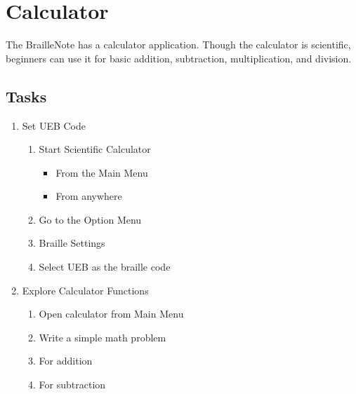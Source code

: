 \documentclass[10pt,letterpaper,twoside]{report}
\begin{document}
\clearpage
\section{Calculator}
The BrailleNote has a calculator application. Though the calculator is scientific, beginners can use it for basic addition, subtraction, multiplication, and division.
\subsection{Tasks}
\begin{enumerate}
	\item Set UEB Code
	      \begin{enumerate}\item Start Scientific Calculator
		            \begin{itemize}
			            \item From the Main Menu 
			            \item From anywhere 
		            \end{itemize}
		      \item Go to the Option Menu 
		      \item Braille Settings 
		      \item Select UEB as the braille code 
	      \end{enumerate}
	\item Explore Calculator Functions
	      \begin{enumerate}
		      \item Open calculator from Main Menu 
		      \item Write a simple math problem
		      \item For addition 
		      \item For subtraction 

\end{enumerate}
\end{enumerate}
\end{document}
